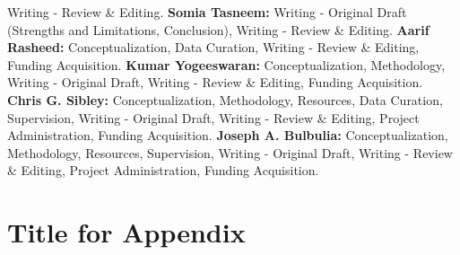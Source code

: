 \documentclass[
  man,
  longtable,
  nolmodern,
  notxfonts,
  notimes,
  colorlinks=true,linkcolor=blue,citecolor=blue,urlcolor=blue]{apa7}
\begin{document}
Writing - Review \& Editing. \textbf{Somia Tasneem:} Writing - Original
Draft (Strengths and Limitations, Conclusion), Writing - Review \&
Editing. \textbf{Aarif Rasheed:} Conceptualization, Data Curation,
Writing - Review \& Editing, Funding Acquisition. \textbf{Kumar
Yogeeswaran:} Conceptualization, Methodology, Writing - Original Draft,
Writing - Review \& Editing, Funding Acquisition. \textbf{Chris G.
Sibley:} Conceptualization, Methodology, Resources, Data Curation,
Supervision, Writing - Original Draft, Writing - Review \& Editing,
Project Administration, Funding Acquisition. \textbf{Joseph A.
Bulbulia:} Conceptualization, Methodology, Resources, Supervision,
Writing - Original Draft, Writing - Review \& Editing, Project
Administration, Funding Acquisition.

\appendix

\section{Title for Appendix}\label{title-for-appendix}
\end{document}
